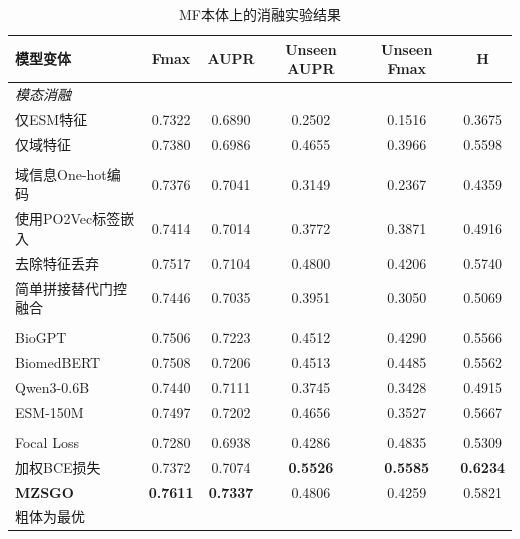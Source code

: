 \begin{table}[htbp]
    \centering
    \caption{MF本体上的消融实验结果}
    \label{tab:mzsgo_ablation_mf}
    \small
    \begin{tabular}{lccccc}
        \toprule
        \textbf{模型变体} & \textbf{Fmax} & \textbf{AUPR} & \textbf{Unseen AUPR} & \textbf{Unseen Fmax} & \textbf{H} \\
        \midrule
        \multicolumn{6}{l}{\textit{模态消融}} \\
        仅ESM特征 & 0.7322 & 0.6890 & 0.2502 & 0.1516 & 0.3675 \\
        仅域特征 & 0.7380 & 0.6986 & 0.4655 & 0.3966 & 0.5598 \\
        \addlinespace[5pt]
        \multicolumn{6}{l}{\textit{特征与架构消融}} \\
        域信息One-hot编码 & 0.7376 & 0.7041 & 0.3149 & 0.2367 & 0.4359 \\
        使用PO2Vec标签嵌入 & 0.7414 & 0.7014 & 0.3772 & 0.3871 & 0.4916 \\
        去除特征丢弃 & 0.7517 & 0.7104 & 0.4800 & 0.4206 & 0.5740 \\
        简单拼接替代门控融合 & 0.7446 & 0.7035 & 0.3951 & 0.3050 & 0.5069 \\
        \addlinespace[5pt]
        \multicolumn{6}{l}{\textit{编码器变体}} \\
        BioGPT & 0.7506 & 0.7223 & 0.4512 & 0.4290 & 0.5566 \\
        BiomedBERT & 0.7508 & 0.7206 & 0.4513 & 0.4485 & 0.5562 \\
        Qwen3-0.6B & 0.7440 & 0.7111 & 0.3745 & 0.3428 & 0.4915 \\
        ESM-150M & 0.7497 & 0.7202 & 0.4656 & 0.3527 & 0.5667 \\
        \addlinespace[5pt]
        \multicolumn{6}{l}{\textit{损失函数变体}} \\
        Focal Loss & 0.7280 & 0.6938 & 0.4286 & 0.4835 & 0.5309 \\
        加权BCE损失 & 0.7372 & 0.7074 & \textbf{0.5526} & \textbf{0.5585} & \textbf{0.6234} \\
        \addlinespace[5pt]
        \textbf{MZSGO} & \textbf{0.7611} & \textbf{0.7337} & 0.4806 & 0.4259 & 0.5821 \\
        \bottomrule
\multicolumn{6}{l}{\vspace{0.2em}\footnotesize 粗体为最优} \\
    \end{tabular}
\end{table}

